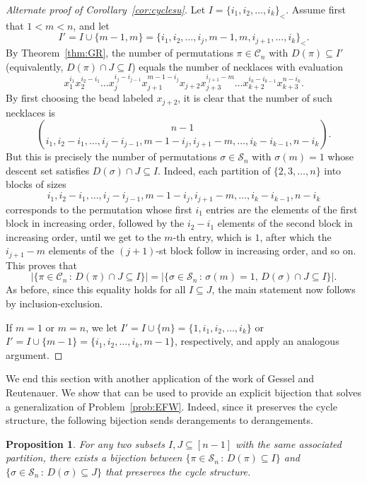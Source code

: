 \documentclass[11pt]{amsart}
\newtheorem{prop}[theorem]{Proposition}
\newcommand\bs{\bigskip}
\renewcommand\S{\mathcal S}
\newcommand\C{\mathcal C}
\begin{document}
\begin{proof}[Alternate proof of Corollary~\ref{cor:cyclesu}]
Let $I=\{i_1,i_2,\dots,i_k\}_<$. Assume first that $1<m<n$, and let $$I'=I\cup\{m-1,m\}=\{i_1,i_2,\dots,i_j,m-1,m,i_{j+1},\dots,i_k\}_<.$$
By Theorem~\ref{thm:GR}, the number of permutations $\pi\in\C_{n}$ with $D(\pi)\subseteq I'$ (equivalently, $D(\pi)\cap J\subseteq I$) equals the number of necklaces with evaluation
$$x_1^{i_1}x_2^{i_2-i_1}\dots x_j^{i_j-i_{j-1}}x_{j+1}^{m-1-i_j}x_{j+2}x_{j+3}^{i_{j+1}-m}\dots x_{k+2}^{i_k-i_{k-1}}x_{k+3}^{n-i_k}.$$
By first choosing the bead labeled $x_{j+2}$, it is clear that the number of such necklaces is
$$\binom{n-1}{i_1,i_2-i_1,\dots,i_j-i_{j-1},m-1-i_j,i_{j+1}-m,\dots,i_k-i_{k-1},n-i_k}.$$
But this is precisely the number of permutations $\sigma\in\S_n$ with $\sigma(m)=1$ whose descent set satisfies $D(\sigma)\cap J\subseteq I$.
Indeed, each partition of $\{2,3,\dots,n\}$ into blocks of sizes $$i_1,i_2-i_1,\dots,i_j-i_{j-1},m-1-i_j,i_{j+1}-m,\dots,i_k-i_{k-1},n-i_k$$
corresponds to the permutation whose first $i_1$ entries are the elements of the first block in increasing order, followed by the $i_2-i_1$ elements
of the second block in increasing order, until we get to the $m$-th entry, which is $1$, after which the $i_{j+1}-m$ elements of the $(j{+}1)$-st block follow in increasing order, and so on.
This proves that
$$|\{\pi\in\C_{n}\,:\,D(\pi)\cap J\subseteq I\}|=|\{\sigma\in\S_n\,:\,\sigma(m)=1,\,D(\sigma)\cap J\subseteq I\}|.$$
As before, since this equality holds for all $I\subseteq J$, the main statement now follows by inclusion-exclusion.

If $m=1$ or $m=n$, we let $I'=I\cup\{m\}=\{1,i_1,i_2,\dots,i_k\}$ or $I'=I\cup\{m-1\}=\{i_1,i_2,\dots,i_k,m-1\}$, respectively, and apply an analogous argument.
\end{proof}

\bs

We end this section with another application of the work of Gessel and Reutenauer. We show that \cite[Lemma 3.4]{GR} can be used to provide an explicit bijection
that solves a generalization of Problem~\ref{prob:EFW}. Indeed, since it preserves the cycle structure, the following bijection sends derangements to derangements.

\begin{prop}\label{prop:subsets} For any two subsets $I,J\subseteq[n-1]$ with the same associated partition, there exists a bijection between
$\{\pi\in\S_n\,:\,D(\pi)\subseteq I\}$ and $\{\sigma\in\S_n\,:\,D(\sigma)\subseteq J\}$ that preserves the cycle structure.
\end{prop}
\end{document}
